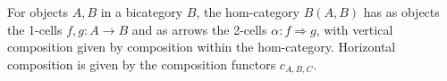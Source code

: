 For objects $A, B$ in a bicategory $B$, the hom-category $B(A, B)$ has as objects the 1-cells $f, g: A \rightarrow B$ and as arrows the 2-cells $\alpha: f \Rightarrow g$, with vertical composition given by composition within the hom-category. Horizontal composition is given by the composition functors $c_{A,B,C}$.